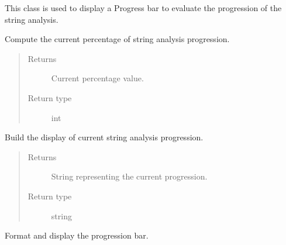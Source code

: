 \documentclass[letterpaper,10pt,oneside]{sphinxmanual}
\begin{document}
\begin{fulllineitems}
\label{index:lib.progress_bar.ProgressBar}
This class is used to display a Progress bar to evaluate the progression
of the string analysis.

\begin{fulllineitems}
\label{index:lib.progress_bar.ProgressBar._ProgressBar__cur_percentage}
Compute the current percentage of string analysis progression.
\begin{quote}\begin{description}
\item[{Returns}] \leavevmode
Current percentage value.

\item[{Return type}] \leavevmode
int

\end{description}\end{quote}

\end{fulllineitems}


\begin{fulllineitems}
\label{index:lib.progress_bar.ProgressBar._ProgressBar__cur_progression}
Build the display of current string analysis progression.
\begin{quote}\begin{description}
\item[{Returns}] \leavevmode
String representing the current progression.

\item[{Return type}] \leavevmode
string

\end{description}\end{quote}

\end{fulllineitems}


\begin{fulllineitems}
\label{index:lib.progress_bar.ProgressBar._ProgressBar__display_bar}
Format and display the progression bar.


\end{fulllineitems}
\end{fulllineitems}
\end{document}
